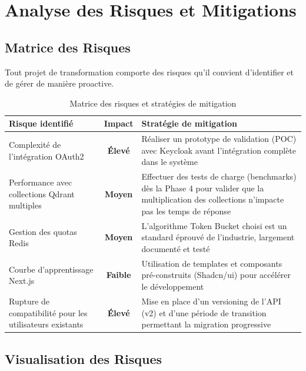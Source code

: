 \documentclass[11pt,a4paper]{report}
\begin{document}
\chapter{Analyse des Risques et Mitigations}

\section{Matrice des Risques}

Tout projet de transformation comporte des risques qu'il convient d'identifier et de gérer de manière proactive.

\begin{table}[H]
\centering
\renewcommand{\arraystretch}{1.5}
\begin{tabularx}{\textwidth}{>{\columncolor{raasLight}}p{3.5cm}cX}
\toprule
\textbf{Risque identifié} & \textbf{Impact} & \textbf{Stratégie de mitigation} \\
\midrule
Complexité de l'intégration OAuth2 & \textcolor{raasError}{\textbf{Élevé}} & Réaliser un prototype de validation (POC) avec Keycloak avant l'intégration complète dans le système \\
\midrule
Performance avec collections Qdrant multiples & \textcolor{raasWarm}{\textbf{Moyen}} & Effectuer des tests de charge (benchmarks) dès la Phase 4 pour valider que la multiplication des collections n'impacte pas les temps de réponse \\
\midrule
Gestion des quotas Redis & \textcolor{raasWarm}{\textbf{Moyen}} & L'algorithme Token Bucket choisi est un standard éprouvé de l'industrie, largement documenté et testé \\
\midrule
Courbe d'apprentissage Next.js & \textcolor{raasSuccess}{\textbf{Faible}} & Utilisation de templates et composants pré-construits (Shadcn/ui) pour accélérer le développement \\
\midrule
Rupture de compatibilité pour les utilisateurs existants & \textcolor{raasError}{\textbf{Élevé}} & Mise en place d'un versioning de l'API (v2) et d'une période de transition permettant la migration progressive \\
\bottomrule
\end{tabularx}
\caption{Matrice des risques et stratégies de mitigation}
\label{tab:risques}
\end{table}

\section{Visualisation des Risques}
\end{document}
